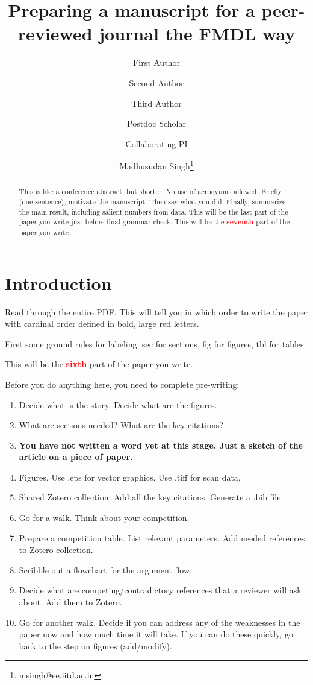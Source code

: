 \documentclass[12 pt]{article}
\title{Preparing a manuscript for a peer-reviewed journal the FMDL way}
\author[1]{\small First Author}
\author[2]{\small Second Author}
\author[1]{\small Third Author}
\author[1]{\small Postdoc Scholar}
\author[2]{\small Collaborating PI}
\author[1]{\small Madhusudan Singh\thanks{msingh@ee.iitd.ac.in}}
\affil[1]{\footnotesize Functional Materials \& Devices Laboratory, Department of Electrical Engineering, IIT Delhi, New Delhi, NCT, India, 110 016.}
\affil[2]{\footnotesize Department of Chemistry, IIT Delhi, New Delhi, NCT, India, 110 016.}
\date{}
\begin{document}
\maketitle
\begin{abstract}
This is like a conference abstract, but shorter. No use of acronymns allowed. Briefly (one sentence), motivate the manuscript. Then say what you did. Finally, summarize the main result, including salient numbers from data. This will be the last part of the paper you write just before final grammar check. This will be the \textbf{\Huge \textcolor{red}{seventh}} part of the paper you write.
\end{abstract}

\section{Introduction}
\label{sec:introduction}

Read through the entire PDF. This will tell you in which order to write the paper with cardinal order defined in bold, large red letters.

First some ground rules for labeling: sec for sections, fig for figures, tbl for tables.

This will be the \textbf{\Huge \textcolor{red}{sixth}} part of the paper you write.

Before you do anything here, you need to complete pre-writing:

\begin{enumerate}
\item Decide what is the story. Decide what are the figures.
\item What are sections needed? What are the key citations?
\item \textbf{You have not written a word yet at this stage. Just a sketch of the article on a piece of paper.}
\item Figures. Use .eps for vector graphics. Use .tiff for scan data.
\item Shared Zotero collection. Add all the key citations. Generate a .bib file.
\item Go for a walk. Think about your competition.
\item Prepare a competition table. List relevant parameters. Add needed references to Zotero collection.
\item Scribble out a flowchart for the argument flow.
\item Decide what are competing/contradictory references that a reviewer will ask about. Add them to Zotero.
\item Go for another walk. Decide if you can address any of the weaknesses in the paper now and how much time it will take. If you can do these quickly, go back to the step on figures (add/modify).
\end{enumerate}
\end{document}
